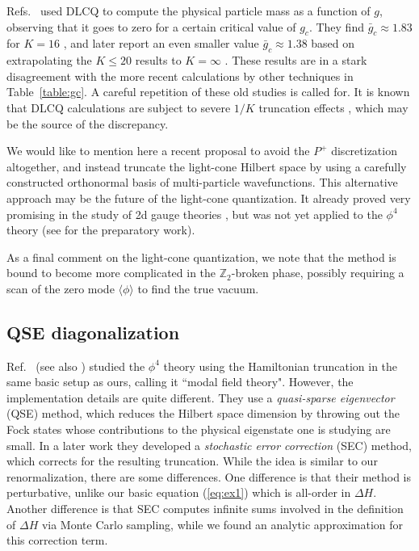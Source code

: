 \documentclass[11pt]{article}
\newcommand{\reef}[1]{(\ref{#1})}
\def\bZ {\mathbb{Z}}
\def\bZ {\mathbb{Z}}
\def\le{\leqslant}
\numberwithin{equation}{section}
\begin{document}
Refs.~\cite{Harindranath:1987db,Harindranath:1988zt} used DLCQ to compute the physical particle mass as a function of $g$, observing that it goes to zero for a certain critical value of $g_c$. They find $\bar g_c\approx 1.83$ for $K=16$ \cite{Harindranath:1987db}, and later report an even smaller value $\bar g_c\approx 1.38$ based on extrapolating the $K\le 20$ results to $K=\infty$ \cite{Harindranath:1988zt}. These results are in a stark disagreement with the more recent calculations by other techniques in Table~\ref{table:gc}. A careful repetition of these old studies is called for. It is known that DLCQ calculations are subject to severe $1/K$ truncation effects \cite{vandeSande:1996mc}, which may be the source of the discrepancy.

We would like to mention here a recent proposal to avoid the $P^+$ discretization altogether, and instead truncate the light-cone Hilbert space by using a carefully constructed orthonormal basis of multi-particle wavefunctions. This alternative approach may be the future of the light-cone quantization. It already proved very promising in the study of 2d gauge theories \cite{Katz:2013qua,Katz:2014uoa}, but was not yet applied to the $\phi^4$ theory (see \cite{Chabysheva:2014rra} for the preparatory work).

As a final comment on the light-cone quantization, we note that the method is bound to become more complicated in the $\bZ_2$-broken phase, possibly requiring a scan of the zero mode $\langle \phi \rangle$ to find the true vacuum.

\subsection{QSE diagonalization}
 
Ref.~\cite{Lee:2000ac} (see also \cite{Lee:2000xna,Salwen:2002dx,Windoloski}) studied the $\phi^4$ theory using the Hamiltonian truncation in the same basic setup as ours, calling it ``modal field theory". However, the implementation details are quite different. They use a \emph{quasi-sparse eigenvector} (QSE) method, which reduces the Hilbert space dimension by throwing out the Fock states whose contributions to the physical eigenstate one is studying are small. In a later work \cite{Lee:2000xna} they developed a \emph{stochastic error correction} (SEC) method, which corrects for the resulting truncation. While the idea is similar to our renormalization, there are some differences. One difference is that their method is perturbative, unlike our basic equation \reef{eq:ex1} which is all-order in $\Delta H$. Another difference is that SEC computes infinite sums involved in the definition of $\Delta H$ via Monte Carlo sampling, while we found an analytic approximation for this correction term. 
\end{document}
